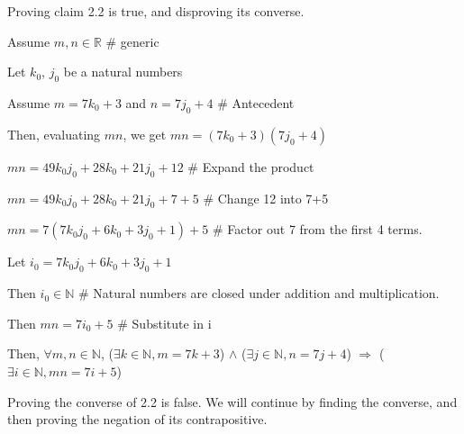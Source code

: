 \documentclass{article}
\begin{document}
\begin{enumerate}
\item Proving claim 2.2 is true, and disproving its converse.

						\item Let $i_0 = 7k_0j_0 + 6k_0 + 3j_0 + 1$
						\item Then $i_0 \in \mathbb{N}$ \# Natural numbers are closed under addition and multiplication.
						\item Then $mn = 7i_0 + 5$ \# Substitute in i
						\end{description}
				\item Then, $\forall m,n \in \mathbb{N}$, ($\exists k \in \mathbb{N}, m = 7k + 3$) $\wedge$ ($\exists j \in \mathbb{N}, n = 7j + 4$) $\Rightarrow$ ($\exists i \in \mathbb{N}, mn = 7i + 5$)
		\end{description}

Proving the converse of 2.2 is false. We will continue by finding the converse, and then proving the negation of its contrapositive.\\


\end{enumerate}
\end{document}
